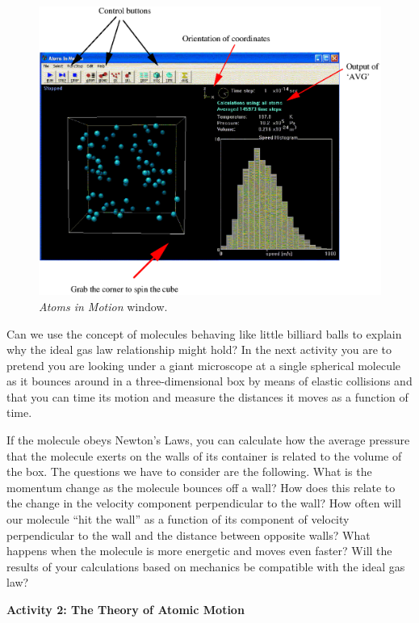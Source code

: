 \begin{figure}[hbt]
\begin{center}
\includegraphics{kin_theory_ideal/am4a.eps}
\caption{\textit{Atoms in Motion} window.}
\end{center}
\end{figure}

Can we use the concept of molecules behaving like little billiard
balls to explain why the ideal gas law relationship might hold? In
the next activity you are to pretend you are looking under a giant
microscope at a single spherical molecule as it bounces around in
a three-dimensional box by means of elastic collisions and that you
can time its motion and measure the distances it moves as a function
of time. 

If the molecule obeys Newton's Laws, you can calculate how the average
pressure that the molecule exerts on the walls of its container is
related to the volume of the box. The questions we have to consider
are the following. What is the momentum change as the
molecule bounces off a wall? How does this relate to the change in
the velocity component perpendicular to the wall? How often will our
molecule ``hit the wall'' as a function of its component
of velocity perpendicular to the wall and the distance between opposite
walls? What happens when the molecule is more energetic and moves
even faster? Will the results of your calculations based on mechanics
be compatible with the ideal gas law?

\pagebreak[2]
\textbf{Activity 2: The Theory of Atomic Motion}

